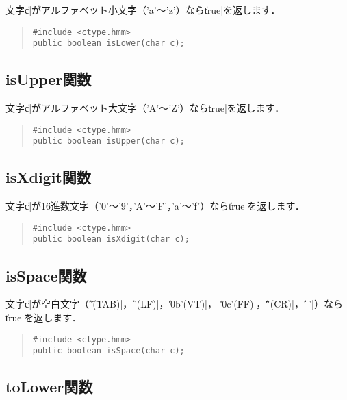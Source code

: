 文字\|c|がアルファベット小文字（'a'〜'z'）なら\|true|を返します．

\begin{quote}
\begin{verbatim}
#include <ctype.hmm>
public boolean isLower(char c);
\end{verbatim}
\end{quote}

\subsection{isUpper関数}

文字\|c|がアルファベット大文字（'A'〜'Z'）なら\|true|を返します．

\begin{quote}
\begin{verbatim}
#include <ctype.hmm>
public boolean isUpper(char c);
\end{verbatim}
\end{quote}

\subsection{isXdigit関数}

文字\|c|が16進数文字（'0'〜'9'，'A'〜'F'，'a'〜'f'）なら\|true|を返します．

\begin{quote}
\begin{verbatim}
#include <ctype.hmm>
public boolean isXdigit(char c);
\end{verbatim}
\end{quote}

\subsection{isSpace関数}

文字\|c|が空白文字（\|'\t'(TAB)|，\|'\n'(LF)|，\|'\x0b'(VT)|，
\|'\x0c'(FF)|，\|'\r'(CR)|，\|' '|）なら\|true|を返します．

\begin{quote}
\begin{verbatim}
#include <ctype.hmm>
public boolean isSpace(char c);
\end{verbatim}
\end{quote}

\subsection{toLower関数}

